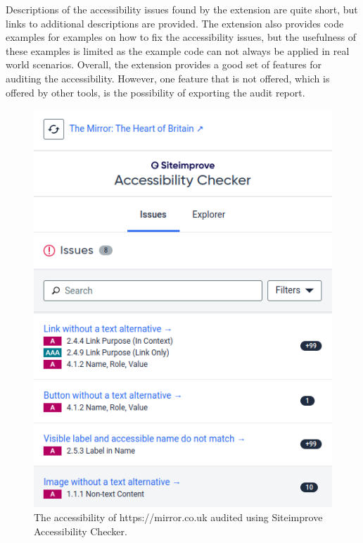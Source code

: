 Descriptions of the accessibility issues found by the extension are quite short, but links to additional descriptions are provided.
The extension also provides code examples for examples on how to fix the accessibility issues, but the usefulness of these examples is limited as the example code can not always be applied in real world scenarios.
Overall, the extension provides a good set of features for auditing the accessibility.
However, one feature that is not offered, which is offered by other tools, is the possibility of exporting the audit report.

\begin{figure}[h]
\centering
\includegraphics[keepaspectratio,width=\linewidth,height=\halfh]
{images/siteimprove-ext.png}

\caption[Siteimprove Accessibility Checker]{
The accessibility of https://mirror.co.uk audited using Siteimprove Accessibility Checker.
}
\label{fig:siteimprove-ext}
\end{figure}


